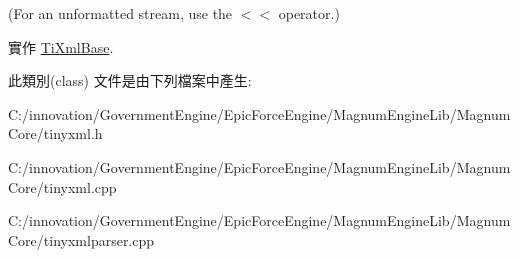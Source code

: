 (For an unformatted stream, use the $<$$<$ operator.) 

實作 \hyperlink{class_ti_xml_base_aaea3e75b489fc3c937f3a7ef096069e7}{Ti\+Xml\+Base}.



此類別(class) 文件是由下列檔案中產生\+:\begin{DoxyCompactItemize}
\item 
C\+:/innovation/\+Government\+Engine/\+Epic\+Force\+Engine/\+Magnum\+Engine\+Lib/\+Magnum\+Core/tinyxml.\+h\item 
C\+:/innovation/\+Government\+Engine/\+Epic\+Force\+Engine/\+Magnum\+Engine\+Lib/\+Magnum\+Core/tinyxml.\+cpp\item 
C\+:/innovation/\+Government\+Engine/\+Epic\+Force\+Engine/\+Magnum\+Engine\+Lib/\+Magnum\+Core/tinyxmlparser.\+cpp\end{DoxyCompactItemize}
